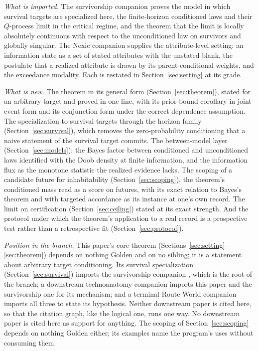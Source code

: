 \emph{What is imported.} The survivorship companion \cite{GoldenSurvivorship} proves
the model in which survival targets are specialized here, the
finite-horizon conditioned laws and their $Q$-process limit in the
critical regime, and the theorem that the limit is locally absolutely
continuous with respect to the unconditioned law on survivors and
globally singular. The Nexic companion \cite{Nexus} supplies the
attribute-level setting: an information state as a set of stated
attributes with the unstated blank, the postulate that a realized
attribute is drawn by its parent-conditional weights, and the exceedance
modality. Each is restated in Section~\ref{sec:setting} at its grade.

\emph{What is new.} The theorem in its general form
(Section~\ref{sec:theorem}), stated for an arbitrary target and proved
in one line, with its prior-bound corollary in joint-event form and its
conjunction form under the correct dependence assumption. The
specialization to survival targets through the horizon family
(Section~\ref{sec:survival}), which removes the zero-probability
conditioning that a naive statement of the survival target commits. The
between-model layer (Section~\ref{sec:models}): the Bayes factor between
conditioned and unconditioned laws identified with the Doob density at
finite information, and the information flux as the monotone statistic
the realized evidence lacks. The scoping of a candidate future for
inhabitability (Section~\ref{sec:scoping}), the theorem's conditioned
mass read as a score on futures, with its exact relation to Bayes's
theorem and with targeted accordance as its instance at one's own record. The limit on certification
(Section~\ref{sec:ceiling}) stated at its exact strength. And the
protocol under which the theorem's application to a real record is a
prospective test rather than a retrospective fit
(Section~\ref{sec:protocol}).

\emph{Position in the branch.} This paper's core theorem
(Sections~\ref{sec:setting}--\ref{sec:theorem}) depends on nothing
Golden and on no sibling; it is a statement about arbitrary target
conditioning. Its survival specialization (Section~\ref{sec:survival})
imports the survivorship companion \cite{GoldenSurvivorship}, which is the root of
the branch; a downstream technoanatomy companion imports this paper and the
survivorship one for its mechanism; and a terminal Route World
companion imports all three to state its hypothesis. Neither downstream
paper is cited here, so that the citation graph, like the logical one,
runs one way. No downstream paper is cited here as support for
anything. The scoping of Section~\ref{sec:scoping} depends on nothing
Golden either; its examples name the program's uses without consuming
them.

